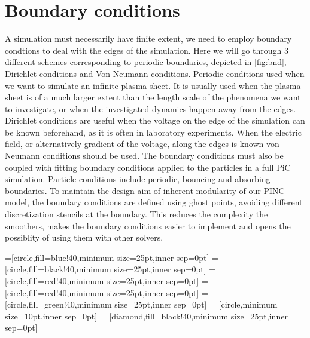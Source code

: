 \section{Boundary conditions}
	\label{sec:bnd_method}
	A simulation must necessarily have finite extent, we need to employ boundary condtions
	to deal with the edges of the simulation. Here we will go through \(3\) different schemes
	corresponding to periodic boundaries, depicted in \cref{fig:bnd}, Dirichlet conditions and Von Neumann conditions.
	Periodic conditions  used when we want to simulate an infinite plasma sheet.
	It is usually used when the plasma sheet is of a much larger extent than the
	length scale of the phenomena we want to investigate, or when the investigated
	dynamics happen away from the edges.
	Dirichlet conditions are useful when the voltage on the edge of the simulation
	can be known beforehand, as it is often in laboratory experiments.
	When the electric field, or alternatively gradient of the voltage, along the edges is known
	von Neumann conditions should be used. The boundary conditions must also be coupled
	with fitting boundary conditions applied to the particles in a full PiC simulation.
	Particle conditions include periodic, bouncing and absorbing boundaries.
	To maintain the design aim of inherent modularity of our PINC model, the boundary conditions
	are defined using ghost points, avoiding different discretization stencils at
	the boundary. This reduces the complexity the smoothers, makes the boundary
	conditions easier to implement and opens the possiblity of using them with other
	solvers.

	=[circle,fill=blue!40,minimum size=25pt,inner sep=0pt]
	=[circle,fill=black!40,minimum size=25pt,inner sep=0pt]
	 = [circle,fill=red!40,minimum size=25pt,inner sep=0pt]
	 = [circle,fill=red!40,minimum size=25pt,inner sep=0pt]
	 = [circle,fill=green!40,minimum size=25pt,inner sep=0pt]
	 = [circle,minimum size=10pt,inner sep=0pt]
	 = [diamond,fill=black!40,minimum size=25pt,inner sep=0pt]

